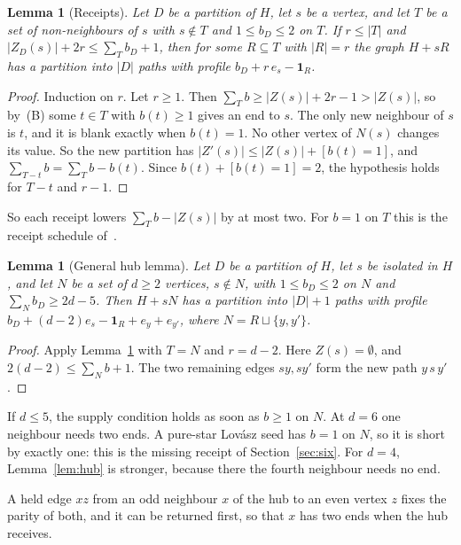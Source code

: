 \documentclass[11pt]{amsart}
\newtheorem{lemma}[theorem]{Lemma}
\theoremstyle{definition}
\begin{document}
\begin{lemma}[Receipts]\label{lem:receipts}
Let $D$ be a partition of $H$, let $s$ be a vertex, and let $T$ be a set of non-neighbours of $s$
with $s\notin T$ and $1\le b_D\le2$ on $T$. If $r\le|T|$ and $|Z_D(s)|+2r\le\sum_Tb_D+1$, then for
some $R\subseteq T$ with $|R|=r$ the graph $H+sR$ has a partition into $|D|$ paths with profile
$b_D+r\,e_s-\mathbf 1_R$.
\end{lemma}
\begin{proof}
Induction on $r$. Let $r\ge1$. Then $\sum_Tb\ge|Z(s)|+2r-1>|Z(s)|$, so by~(B) some $t\in T$ with
$b(t)\ge1$ gives an end to $s$. The only new neighbour of $s$ is $t$, and it is blank exactly when
$b(t)=1$. No other vertex of $N(s)$ changes its value. So the new partition has
$|Z'(s)|\le|Z(s)|+[b(t)=1]$, and $\sum_{T-t}b=\sum_Tb-b(t)$. Since $b(t)+[b(t)=1]=2$, the hypothesis
holds for $T-t$ and $r-1$.
\end{proof}
So each receipt lowers $\sum_Tb-|Z(s)|$ by at most two. For $b=1$ on $T$ this is the receipt
schedule of~\cite[Remark~3.5]{D6}.

\begin{lemma}[General hub lemma]\label{lem:genhub}
Let $D$ be a partition of $H$, let $s$ be isolated in $H$, and let $N$ be a set of $d\ge2$
vertices, $s\notin N$, with $1\le b_D\le2$ on $N$ and $\sum_Nb_D\ge2d-5$. Then $H+sN$ has a
partition into $|D|+1$ paths with profile $b_D+(d-2)e_s-\mathbf 1_R+e_y+e_{y'}$, where
$N=R\sqcup\{y,y'\}$.
\end{lemma}
\begin{proof}
Apply Lemma~\ref{lem:receipts} with $T=N$ and $r=d-2$. Here $Z(s)=\emptyset$, and
$2(d-2)\le\sum_Nb+1$. The two remaining edges $sy,sy'$ form the new path $y\,s\,y'$.
\end{proof}
If $d\le5$, the supply condition holds as soon as $b\ge1$ on $N$. At $d=6$ one neighbour needs
two ends. A pure-star Lov\'asz seed has $b=1$ on $N$, so it is short by exactly one: this is the
missing receipt of Section~\ref{sec:six}. For $d=4$, Lemma~\ref{lem:hub} is stronger, because
there the fourth neighbour needs no end.

A held edge $xz$ from an odd neighbour $x$ of the hub to an even vertex $z$ fixes the parity of
both, and it can be returned first, so that $x$ has two ends when the hub receives.
\end{document}
